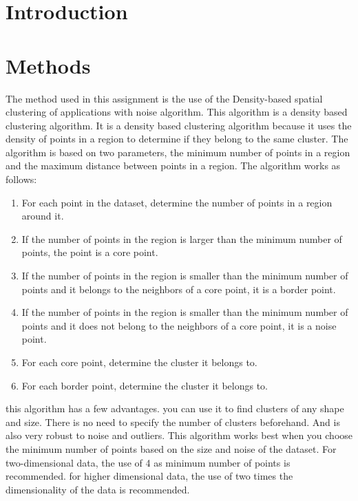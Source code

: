 \documentclass[twoside, a4paper, fleqn, reqno]{article}
\begin{document}
\maketitle

\section*{Introduction}

\section*{Methods}

The method used in this assignment is the use of the Density-based spatial clustering of applications with noise algorithm. 
This algorithm is a density based clustering algorithm. 
It is a density based clustering algorithm because it uses the density of points in a region to determine if they belong to the same cluster. 
The algorithm is based on two parameters, the minimum number of points in a region and the maximum distance between points in a region. 
The algorithm works as follows:
\begin{enumerate}
	\item For each point in the dataset, determine the number of points in a region around it.
	\item If the number of points in the region is larger than the minimum number of points, the point is a core point.
	\item If the number of points in the region is smaller than the minimum number of points and it belongs to the neighbors of a core point, it is a border point.
	\item If the number of points in the region is smaller than the minimum number of points and it does not belong to the neighbors of a core point, it is a noise point.
	\item For each core point, determine the cluster it belongs to.
	\item For each border point, determine the cluster it belongs to.
\end{enumerate}
this algorithm has a few advantages. you can use it to find clusters of any shape and size.
There is no need to specify the number of clusters beforehand. And is also very robust to noise and outliers.
This algorithm works best when you choose the minimum number of points based on the size and noise of the dataset.
For two-dimensional data, the use of 4 as minimum number of points is recommended.
for higher dimensional data, the use of two times the dimensionality of the data is recommended.
\end{document}
